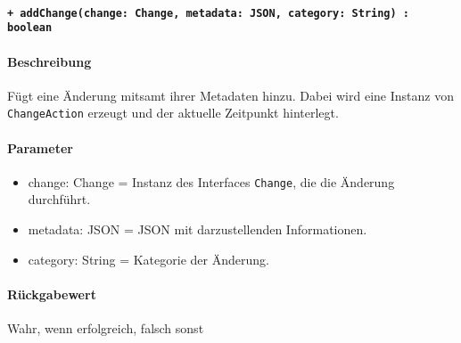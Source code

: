 \paragraph{\texttt{+ addChange(change: Change, metadata: JSON, category: String) : boolean}}\label{AP_Framework_addChange}%
\paragraph*{Beschreibung}
Fügt eine Änderung mitsamt ihrer Metadaten hinzu.
Dabei wird eine Instanz von \verb#ChangeAction# erzeugt und der aktuelle Zeitpunkt hinterlegt.
\paragraph*{Parameter}
\begin{itemize}
    \item change: Change = Instanz des Interfaces \verb#Change#, die die Änderung durchführt.
    \item metadata: JSON = JSON mit darzustellenden Informationen.
    \item category: String = Kategorie der Änderung.
\end{itemize}
\paragraph*{Rückgabewert}
Wahr, wenn erfolgreich, falsch sonst
